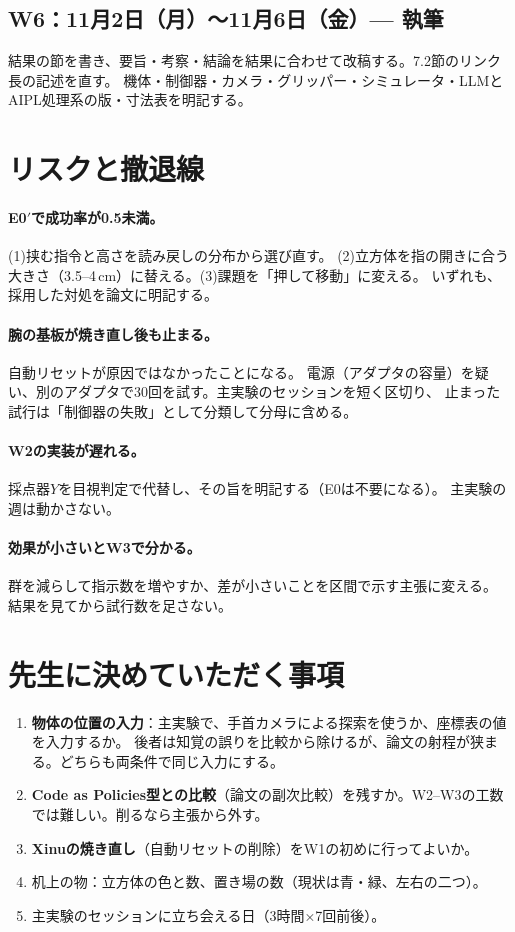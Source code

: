 \documentclass[11pt,a4paper]{article}
\begin{document}
\subsection*{W6：11月2日（月）〜11月6日（金）— 執筆}
結果の節を書き、要旨・考察・結論を結果に合わせて改稿する。7.2節のリンク長の記述を直す。
機体・制御器・カメラ・グリッパー・シミュレータ・LLMとAIPL処理系の版・寸法表を明記する。

\section{リスクと撤退線}

\paragraph{E0$'$で成功率が0.5未満。}(1)挟む指令と高さを読み戻しの分布から選び直す。
(2)立方体を指の開きに合う大きさ（3.5--4\,cm）に替える。(3)課題を「押して移動」に変える。
いずれも、採用した対処を論文に明記する。

\paragraph{腕の基板が焼き直し後も止まる。}自動リセットが原因ではなかったことになる。
電源（アダプタの容量）を疑い、別のアダプタで30回を試す。主実験のセッションを短く区切り、
止まった試行は「制御器の失敗」として分類して分母に含める。

\paragraph{W2の実装が遅れる。}採点器$Y$を目視判定で代替し、その旨を明記する（E0は不要になる）。
主実験の週は動かさない。

\paragraph{効果が小さいとW3で分かる。}群を減らして指示数を増やすか、差が小さいことを区間で示す主張に変える。
結果を見てから試行数を足さない。

\section{先生に決めていただく事項}

\begin{enumerate}
\item \textbf{物体の位置の入力}：主実験で、手首カメラによる探索を使うか、座標表の値を入力するか。
後者は知覚の誤りを比較から除けるが、論文の射程が狭まる。どちらも両条件で同じ入力にする。
\item \textbf{Code as Policies型との比較}（論文の副次比較）を残すか。W2--W3の工数では難しい。削るなら主張から外す。
\item \textbf{Xinuの焼き直し}（自動リセットの削除）をW1の初めに行ってよいか。
\item 机上の物：立方体の色と数、置き場の数（現状は青・緑、左右の二つ）。
\item 主実験のセッションに立ち会える日（3時間×7回前後）。
\end{enumerate}
\end{document}
